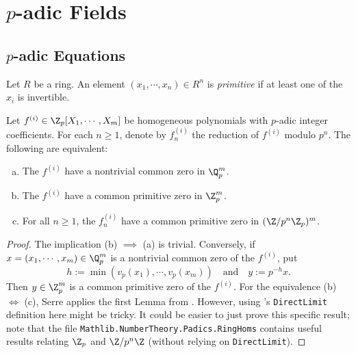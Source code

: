 \chapter[p-adic Fields]{$p$-adic Fields}

\section[p-adic Equations]{$p$-adic Equations}\label{sec:padic_equations}

\begin{definition}\label{def:primitive}
\leanok
Let $R$ be a ring. An element $(x_1, \cdots, x_n) \in R^n$ is \emph{primitive} if at least one of the $x_i$ is invertible.
\end{definition}


\begin{proposition}\label{prop:common_root}
\leanok
{}
Let $f^{(i)} \in \Z_p[X_1, \cdots, X_m]$ be homogeneous polynomials with $p$-adic integer coefficients. For each $n \ge 1$, denote by $f_n^{(i)}$ the reduction of $f^{(i)}$ modulo $p^n$.
 The following are equivalent:
\begin{enumerate}[(a)]
\leanok
\item The $f^{(i)}$ have a nontrivial common zero in $\Q_p^m$.
\item The $f^{(i)}$ have a common primitive zero in $\Z_p^m$.
\item For all $n \ge 1$, the $f_n^{(i)}$ have a common primitive zero in $(\Z / p^n \Z_p)^m$.
\end{enumerate}
\end{proposition}

\begin{proof}
The implication (b) $ \implies$ (a) is trivial. Conversely, if $x = (x_1, \cdots, x_m) \in \Q_p^m$ is a nontrivial common zero of the $f^{(i)}$, put
\[ h := \min(v_p(x_1), \cdots, v_p(x_m)) \quad \text{and} \quad y := p^{-h} x. \]
Then $y \in \Z_p^m$ is a common primitive zero of the $f^{(i)}$.
For the equivalence (b) $\iff$ (c), Serre applies the first Lemma from \cite[\S II.2.1]{Ser73}. However, using \mathlib's \texttt{DirectLimit} definition here might be tricky. It could be easier to just prove this specific result; note that the file \texttt{Mathlib.NumberTheory.Padics.RingHoms} contains useful results relating $\Z_p$ and $\Z/p^n\Z$ (without relying on \texttt{DirectLimit}).

\end{proof}

